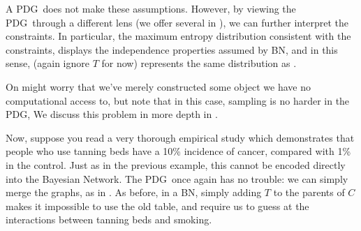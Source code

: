 \documentclass{article}
\newcommand{\MN}{PDG}
\numberwithin{equation}{section}
\begin{document}
\begin{notfocus}
\begin{example}
		
		A \MN\ does not make these assumptions. However, by viewing the \MN\ through a different lens (we offer several in ), we can further interpret the constraints. In particular, the maximum entropy distribution consistent with the constraints, displays the independence properties assumed by BN, and in this sense,  (again ignore $T$ for now) represents the same distribution as .
		\begin{vfull}
			On might worry that we've merely constructed some object we have no computational access to, but note that in this case, sampling is no harder in the \MN, We discuss this problem in more depth in .
		\end{vfull}
				
		Now, suppose you read a very thorough empirical study which demonstrates that people who use tanning beds have a 10\% incidence of cancer, compared with 1\% in the control. Just as in the previous example, this cannot be encoded directly into the Bayesian Network. 
		The \MN\, once again has no trouble: we can simply merge the graphs, as in .
%			
		As before, in a BN, simply adding $T$ to the parents of $C$ makes it impossible to use the old table, and require us to guess at the interactions between tanning beds and smoking.
	\end{example}	




\end{notfocus}
\end{document}
